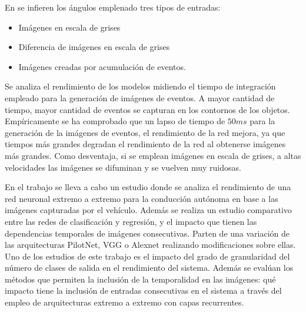 En \cite{event} se infieren los ángulos emplenado tres tipos de entradas:

\begin{itemize}
    \item Imágenes en escala de grises
    \item Diferencia de imágenes en escala de grises
    \item Imágenes creadas por acumulación de eventos.
\end{itemize}

Se analiza el rendimiento de los modelos midiendo el tiempo de integración empleado para la generación de imágenes de eventos. A mayor cantidad de tiempo, mayor cantidad de eventos se capturan en los contornos de los objetos. Empíricamente se ha comprobado que un lapso de tiempo de $ 50 ms $ para la generación de la imágenes de eventos, el rendimiento de la red mejora, ya que tiempos más grandes degradan el rendimiento de la red al obtenerse imágenes más grandes. Como desventaja, si se emplean imágenes en escala de grises, a altas velocidades las imágenes se difuminan y se vuelven muy ruidosas.

En el trabajo \cite{pixels} se lleva a cabo un estudio donde se analiza el rendimiento de una red neuronal extremo a extremo para la conducción autónoma en base a las imágenes capturadas por el vehículo. Además se realiza un estudio comparativo entre las redes de clasificación y regresión, y el impacto que tienen las dependencias temporales de imágenes consecutivas. Parten de una variación de las arquitecturas PilotNet, VGG o Alexnet realizando modificaciones sobre ellas. Uno de los estudios de este trabajo es el impacto del grado de granularidad del número de clases de salida en el rendimiento del sistema. Además se evalúan los métodos que permiten la inclusión de la temporalidad en las imágenes: qué impacto tiene la inclusión de entradas consecutivas en el sistema a través del empleo de arquitecturas extremo a extremo con capas recurrentes.

